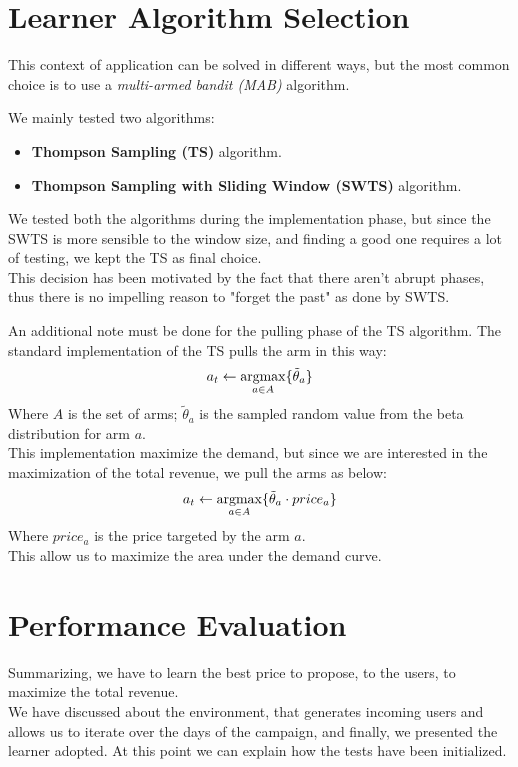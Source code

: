 \section{Learner Algorithm Selection}

This context of application can be solved in different ways, but the most common choice is to use a \textit{multi-armed bandit (MAB)} algorithm.

We mainly tested two algorithms:
\begin{itemize}
    \item \textbf{Thompson Sampling (TS)} algorithm.
    \item \textbf{Thompson Sampling with Sliding Window (SWTS)} algorithm.
\end{itemize}

We tested both the algorithms during the implementation phase, but since the SWTS is more sensible to the window size, and finding a good one requires a lot of testing, we kept the TS as final choice.\\
This decision has been motivated by the fact that there aren't abrupt phases, thus there is no impelling reason to "forget the past" as done by SWTS.

An additional note must be done for the pulling phase of the TS algorithm. The standard implementation of the TS pulls the arm in this way:
\begin{equation}
    a_t \leftarrow \operatorname*{argmax}_{a \in A} \{\tilde{\theta}_a\}
\end{equation}
Where $A$ is the set of arms; $\tilde{\theta}_a$  is the sampled random value from the beta distribution for arm $a$.\\
This implementation maximize the demand, but since we are interested in the maximization of the total revenue, we pull the arms as below:
\begin{equation}
    a_t \leftarrow \operatorname*{argmax}_{a \in A} \{\tilde{\theta}_a \cdot price_a\}
\end{equation}
Where $price_a$ is the price targeted by the arm $a$.\\
This allow us to maximize the area under the demand curve.


\section{Performance Evaluation}

Summarizing, we have to learn the best price to propose, to the users, to maximize the total revenue.\\
We have discussed about the environment, that generates incoming users and allows us to iterate over the days of the campaign, and finally, we presented the learner adopted.
At this point we can explain how the tests have been initialized.

